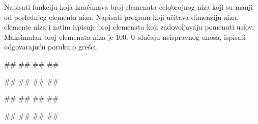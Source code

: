 \ifresenja
\begin{Answer}[ref=v.nizovi_funkcije_intro]
\end{Answer}
\fi


\begin{Exercise}[label=p.broj_manjih_od_poslednjeg] 
 Napisati funkciju koja izračunava broj elemenata celobrojnog niza koji su
 manji od poslednjeg elementa niza. 
 Napisati program koji učitava dimenziju niza, elemente niza i zatim ispisuje broj
 elemenata koji zadovoljavaju pomenuti uslov.
 Maksimalan broj elemenata niza je $100$.
 U slučaju neispravnog unosa, ispisati odgovarajuću poruku o grešci. 

\begin{miditest}
\begin{upotreba}{1}
#\naslovInt#
##
##
##
\end{upotreba}
\end{miditest}
\begin{miditest}
\begin{upotreba}{2}
#\naslovInt#
##
##
##
\end{upotreba}
\end{miditest}

\begin{miditest}
\begin{upotreba}{3}
#\naslovInt#
##
##
##
\end{upotreba}
\end{miditest}
\begin{miditest}
\begin{upotreba}{4}
#\naslovInt#
##
##
##
\end{upotreba}
\end{miditest}

\end{Exercise}

\ifresenja
\begin{Answer}[ref=p.broj_manjih_od_poslednjeg]
\end{Answer}
\fi


